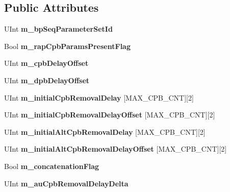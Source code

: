 \subsection*{Public Attributes}
\begin{DoxyCompactItemize}
\item 
\mbox{\label{class_s_e_i_buffering_period_a9230824b1c19800c2ce3e707efda91ba}} 
U\+Int {\bfseries m\+\_\+bp\+Seq\+Parameter\+Set\+Id}
\item 
\mbox{\label{class_s_e_i_buffering_period_a1a97240913ca74b164d97b3d53edb465}} 
Bool {\bfseries m\+\_\+rap\+Cpb\+Params\+Present\+Flag}
\item 
\mbox{\label{class_s_e_i_buffering_period_a51daa502f7f96913e2d4f87e556c3734}} 
U\+Int {\bfseries m\+\_\+cpb\+Delay\+Offset}
\item 
\mbox{\label{class_s_e_i_buffering_period_a590d3eaada97380ff0d88f23f13ae846}} 
U\+Int {\bfseries m\+\_\+dpb\+Delay\+Offset}
\item 
\mbox{\label{class_s_e_i_buffering_period_a1336f1da7278f40da47be2a817de8a8f}} 
U\+Int {\bfseries m\+\_\+initial\+Cpb\+Removal\+Delay} \mbox{[}M\+A\+X\+\_\+\+C\+P\+B\+\_\+\+C\+NT\mbox{]}\mbox{[}2\mbox{]}
\item 
\mbox{\label{class_s_e_i_buffering_period_a979fdf7faae8e48a5ac227591091097e}} 
U\+Int {\bfseries m\+\_\+initial\+Cpb\+Removal\+Delay\+Offset} \mbox{[}M\+A\+X\+\_\+\+C\+P\+B\+\_\+\+C\+NT\mbox{]}\mbox{[}2\mbox{]}
\item 
\mbox{\label{class_s_e_i_buffering_period_a18729f3089707723bcae7091fc11fedf}} 
U\+Int {\bfseries m\+\_\+initial\+Alt\+Cpb\+Removal\+Delay} \mbox{[}M\+A\+X\+\_\+\+C\+P\+B\+\_\+\+C\+NT\mbox{]}\mbox{[}2\mbox{]}
\item 
\mbox{\label{class_s_e_i_buffering_period_aa688fef65f203575718057c5eba10a21}} 
U\+Int {\bfseries m\+\_\+initial\+Alt\+Cpb\+Removal\+Delay\+Offset} \mbox{[}M\+A\+X\+\_\+\+C\+P\+B\+\_\+\+C\+NT\mbox{]}\mbox{[}2\mbox{]}
\item 
\mbox{\label{class_s_e_i_buffering_period_a28309569ab5062bfa1b4e6880a9daed4}} 
Bool {\bfseries m\+\_\+concatenation\+Flag}
\item 
\mbox{\label{class_s_e_i_buffering_period_a9ff1d726f2fdbe1f3c5b555d7f0a5911}} 
U\+Int {\bfseries m\+\_\+au\+Cpb\+Removal\+Delay\+Delta}
\end{DoxyCompactItemize}
